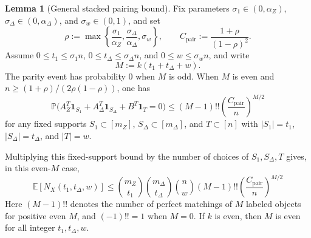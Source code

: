 \documentclass[11pt]{article}
\theoremstyle{definition}
\newtheorem{lemma}[theorem]{Lemma}
\newcommand{\EE}{\mathbb E}
\newcommand{\PP}{\mathbb P}
\newcommand{\ones}{\mathbf 1}
\newcommand{\NX}{N_X}
\begin{document}
\begin{lemma}[General stacked pairing bound]\label{lem:pair-jp}
Fix parameters \(\sigma_1\in(0,\alpha_Z)\), \(\sigma_\Delta\in(0,\alpha_\Delta)\), and \(\sigma_w\in(0,1)\), and set
\[
\rho:=\max\left\{\frac{\sigma_1}{\alpha_Z},\frac{\sigma_\Delta}{\alpha_\Delta},\sigma_w\right\},
\qquad
C_{\mathrm{pair}}:=\frac{1+\rho}{(1-\rho)^2}.
\]
Assume \(0\le t_1\le \sigma_1 n\), \(0\le t_\Delta\le \sigma_\Delta n\), and \(0\le w\le \sigma_w n\), and write
\[
M:=k(t_1+t_\Delta+w).
\]
The parity event has probability \(0\) when \(M\) is odd. When \(M\) is even and \(n\ge (1+\rho)/(2\rho(1-\rho))\), one has
\begin{equation*}
\PP\bigl(A_Z^T\ones_{S_1}+A_\Delta^T\ones_{S_\Delta}+B^T\ones_T=0\bigr)
\le
(M-1)!!\left(\frac{C_{\mathrm{pair}}}{n}\right)^{M/2}
\end{equation*}
for any fixed supports \(S_1\subset[m_Z]\), \(S_\Delta\subset[m_\Delta]\), and \(T\subset[n]\) with
\(|S_1|=t_1\), \(|S_\Delta|=t_\Delta\), and \(|T|=w\).

Multiplying this fixed-support bound by the number of choices of \(S_1,S_\Delta,T\) gives, in this even-\(M\) case,
\begin{equation*}
\EE[\NX(t_1,t_\Delta,w)]
\le
\binom{m_Z}{t_1}\binom{m_\Delta}{t_\Delta}\binom{n}{w}
(M-1)!!\left(\frac{C_{\mathrm{pair}}}{n}\right)^{M/2}
\end{equation*}
Here \((M-1)!!\) denotes the number of perfect matchings of \(M\) labeled objects for positive even \(M\), and \((-1)!!=1\) when \(M=0\).
If \(k\) is even, then \(M\) is even for all integer \(t_1,t_\Delta,w\).
\end{lemma}
\end{document}
